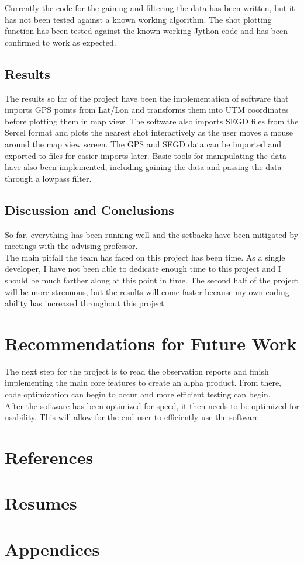 \documentclass[11pt]{article}
\begin{document}
Currently the code for the gaining and filtering the data has been written, but it has not been tested against a known working algorithm. The shot plotting function has been tested against the known working Jython code and has been confirmed to work as expected.

\subsection{Results}

The results so far of the project have been the implementation of software that imports GPS points from Lat/Lon and transforms them into UTM coordinates before plotting them in map view. The software also imports SEGD files from the Sercel format and plots the nearest shot interactively as the user moves a mouse around the map view screen. The GPS and SEGD data can be imported and exported to files for easier imports later. Basic tools for manipulating the data have also been implemented, including gaining the data and passing the data through a lowpass filter.

\subsection{Discussion and Conclusions}

So far, everything has been running well and the setbacks have been mitigated by meetings with the advising professor.  \\

The main pitfall the team has faced on this project has been time. As a single developer, I have not been able to dedicate enough time to this project and I should be much farther along at this point in time. The second half of the project will be more strenuous, but the results will come faster because my own coding ability has increased throughout this project. 

\section{Recommendations for Future Work}

The next step for the project is to read the observation reports and finish implementing the main core features to create an alpha product. From there, code optimization can begin to occur and more efficient testing can begin. \\

After the software has been optimized for speed, it then needs to be optimized for usability. This will allow for the end-user to efficiently use the software.

\section{References}

\printbibliography

\newpage
\section{Resumes}

%

\section{Appendices}
\end{document}
